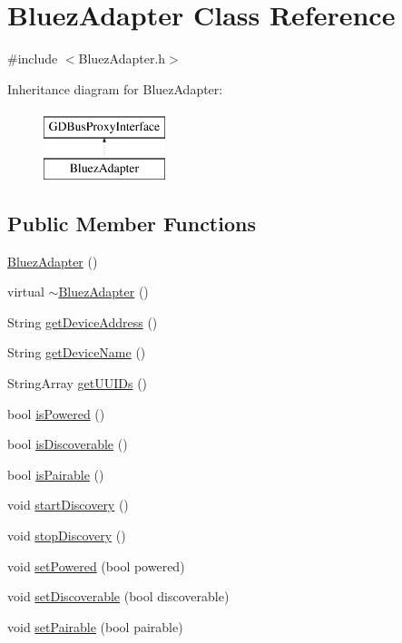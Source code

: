 \hypertarget{classBluezAdapter}{}\section{Bluez\+Adapter Class Reference}
\label{classBluezAdapter}


{\ttfamily \#include $<$Bluez\+Adapter.\+h$>$}

Inheritance diagram for Bluez\+Adapter\+:\begin{figure}[H]
\begin{center}
\leavevmode
\includegraphics[height=2.000000cm]{classBluezAdapter}
\end{center}
\end{figure}
\subsection*{Public Member Functions}
\begin{DoxyCompactItemize}
\item 
\mbox{\hyperlink{classBluezAdapter_a4c13c29bc5d719da9281ee9bb262680b}{Bluez\+Adapter}} ()
\item 
virtual \mbox{\hyperlink{classBluezAdapter_a49b8631d8456928d93fec60bdb0fdeea}{$\sim$\+Bluez\+Adapter}} ()
\item 
String \mbox{\hyperlink{classBluezAdapter_a777e893a903ad755960dd18aa52bb824}{get\+Device\+Address}} ()
\item 
String \mbox{\hyperlink{classBluezAdapter_a3c30eb092f0ce00a0adcaf8430576767}{get\+Device\+Name}} ()
\item 
String\+Array \mbox{\hyperlink{classBluezAdapter_a34f2f5d3e90f16fb01c34336135e13ad}{get\+U\+U\+I\+Ds}} ()
\item 
bool \mbox{\hyperlink{classBluezAdapter_a81ef46af5532b8146a1def135473bae2}{is\+Powered}} ()
\item 
bool \mbox{\hyperlink{classBluezAdapter_a4c3010d6bf4d539455579001e406d5ff}{is\+Discoverable}} ()
\item 
bool \mbox{\hyperlink{classBluezAdapter_aa3bcc21699bb55244bb34ad19d41bd99}{is\+Pairable}} ()
\item 
void \mbox{\hyperlink{classBluezAdapter_a7151568b9de977c65373399d34155a58}{start\+Discovery}} ()
\item 
void \mbox{\hyperlink{classBluezAdapter_a0f5b87579212656ab24d33f662f72522}{stop\+Discovery}} ()
\item 
void \mbox{\hyperlink{classBluezAdapter_a0aaed613add9515dfd18f1e0092b6efa}{set\+Powered}} (bool powered)
\item 
void \mbox{\hyperlink{classBluezAdapter_a3bfcc40f89889fdc38f6502c967a810d}{set\+Discoverable}} (bool discoverable)
\item 
void \mbox{\hyperlink{classBluezAdapter_a1520b6f93d0d263ec2a15c32963c09b7}{set\+Pairable}} (bool pairable)
\end{DoxyCompactItemize}


